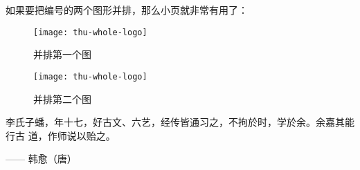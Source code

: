 如果要把编号的两个图形并排，那么小页就非常有用了：
\begin{figure}
\begin{minipage}{0.48\textwidth}
  \centering
  \texttt{[image: thu-whole-logo]}
  \caption{并排第一个图}
  \label{fig:parallel1}
\end{minipage}\hfill
\begin{minipage}{0.48\textwidth}
  \centering
  \texttt{[image: thu-whole-logo]}
  \caption{并排第二个图}
  \label{fig:parallel2}
\end{minipage}
\end{figure}

李氏子蟠，年十七，好古文、六艺，经传皆通习之，不拘於时，学於余。余嘉其能行古
道，作师说以贻之。

\hfill —— 韩愈（唐）

